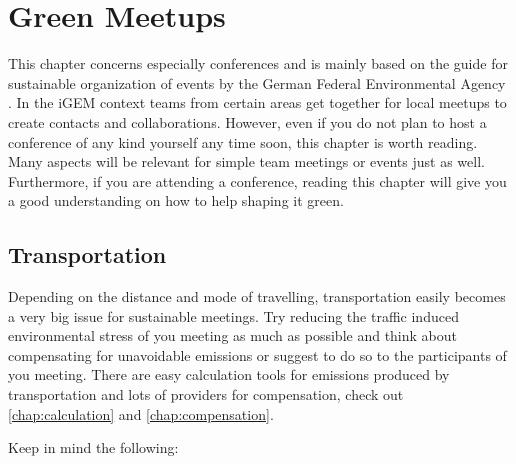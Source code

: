 
\chapter{Green Meetups}\label{chap:meetup}
This chapter concerns especially conferences and is mainly based on the guide for sustainable organization of events by the German Federal Environmental Agency \cite{meeting}. In the iGEM context teams from certain areas get together for local meetups to create contacts and collaborations. However, even if you do not plan to host a conference of any kind yourself any time soon, this chapter is worth reading. Many aspects will be relevant for simple team meetings or events just as well. Furthermore, if you are attending a conference, reading this chapter will give you a good understanding on how to help shaping it green.

\section{Transportation}
Depending on the distance and mode of travelling, transportation easily becomes a very big issue for sustainable meetings. Try reducing the traffic induced environmental stress of you meeting as much as possible and think about compensating for unavoidable emissions or suggest to do so to the participants of you meeting. There are easy calculation tools for emissions produced by transportation and lots of providers for compensation, check out \cref{chap:calculation} and \cref{chap:compensation}.
	
Keep in mind the following:

